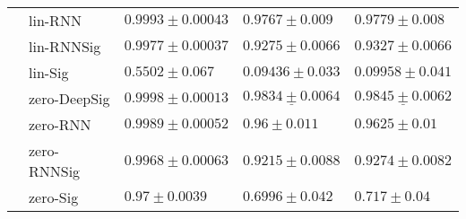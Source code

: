 \begin{tabular}{lllll}
       & lin-RNN &                           $ 0.9993 \pm 0.00043 $ &                            $ 0.9767 \pm 0.009 $ &                            $ 0.9779 \pm 0.008 $ \\
       & lin-RNNSig &                           $ 0.9977 \pm 0.00037 $ &                           $ 0.9275 \pm 0.0066 $ &                           $ 0.9327 \pm 0.0066 $ \\
       & lin-Sig &                             $ 0.5502 \pm 0.067 $ &                           $ 0.09436 \pm 0.033 $ &                           $ 0.09958 \pm 0.041 $ \\
       & zero-DeepSig &               $  \mathbf{ 0.9998 \pm 0.00013 } $ &            $  \underline{ 0.9834 \pm 0.0064 } $ &            $  \underline{ 0.9845 \pm 0.0062 } $ \\
       & zero-RNN &                           $ 0.9989 \pm 0.00052 $ &                              $ 0.96 \pm 0.011 $ &                             $ 0.9625 \pm 0.01 $ \\
       & zero-RNNSig &                           $ 0.9968 \pm 0.00063 $ &                           $ 0.9215 \pm 0.0088 $ &                           $ 0.9274 \pm 0.0082 $ \\
       & zero-Sig &                              $ 0.97 \pm 0.0039 $ &                            $ 0.6996 \pm 0.042 $ &                              $ 0.717 \pm 0.04 $ \\
\bottomrule
\end{tabular}
